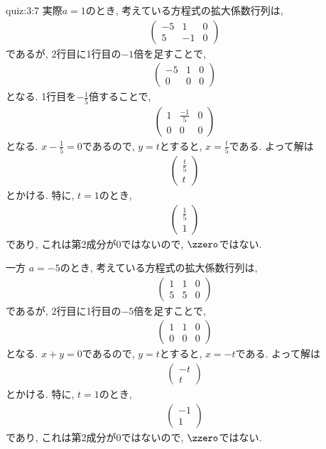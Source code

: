 \begin{answerof}{quiz:3:7}
  実際$a=1$のとき,
  考えている方程式の拡大係数行列は,
  \begin{align*}
    \begin{pmatrix}-5&1&0\\5&-1&0\end{pmatrix}
  \end{align*}
  であるが, 2行目に1行目の$-1$倍を足すことで,
  \begin{align*}
    \begin{pmatrix}-5&1&0\\0&0&0\end{pmatrix}
  \end{align*}
  となる. 1行目を$-\frac{1}{5}$倍することで,
  \begin{align*}
    \begin{pmatrix}1&\frac{-1}{5}&0\\0&0&0\end{pmatrix}
  \end{align*}
  となる.  $x-\frac{1}{5}=0$であるので, $y=t$とすると, $x=\frac{t}{5}$である.
  よって解は
  \begin{align*}
    \begin{pmatrix}\frac{t}{5}\\t\end{pmatrix}
  \end{align*}
  とかける. 特に, $t=1$のとき,
  \begin{align*}
    \begin{pmatrix}\frac{1}{5}\\1\end{pmatrix}
  \end{align*}
  であり, これは第2成分が$0$ではないので, $\zzero$ではない.

  一方
  $a=-5$のとき,
  考えている方程式の拡大係数行列は,
  \begin{align*}
    \begin{pmatrix}1&1&0\\5&5&0\end{pmatrix}
  \end{align*}
  であるが, 2行目に1行目の$-5$倍を足すことで,
  \begin{align*}
    \begin{pmatrix}1&1&0\\0&0&0\end{pmatrix}
  \end{align*}
  となる.
  $x+y=0$であるので, $y=t$とすると, $x=-t$である.
  よって解は
  \begin{align*}
    \begin{pmatrix}-t\\t\end{pmatrix}
  \end{align*}
  とかける. 特に, $t=1$のとき,
  \begin{align*}
    \begin{pmatrix}-1\\1\end{pmatrix}
  \end{align*}
  であり, これは第2成分が$0$ではないので, $\zzero$ではない.  
\end{answerof}


